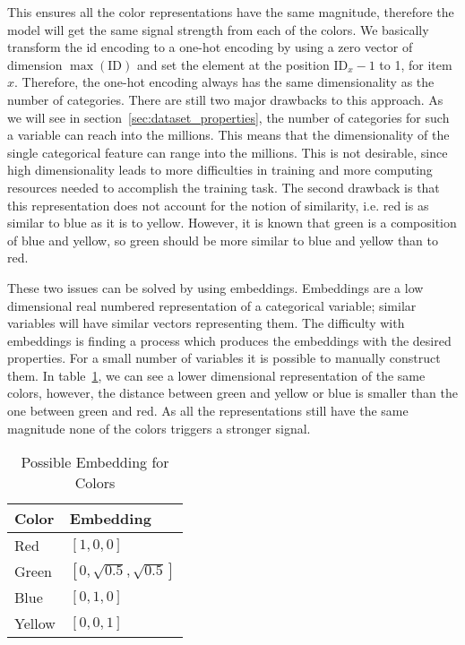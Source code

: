 This ensures all the color representations have the same magnitude, therefore the model will get the same signal strength from each of the colors.
We basically transform the id encoding to a one-hot encoding by using a zero vector of dimension $\max(\text{ID})$ and set the element at the position $\text{ID}_x-1$ to 1, for item $x$.
Therefore, the one-hot encoding always has the same dimensionality as the number of categories.
There are still two major drawbacks to this approach.
As we will see in section~\ref{sec:dataset_properties}, the number of categories for such a variable can reach into the millions.
This means that the dimensionality of the single categorical feature can range into the millions.
This is not desirable, since high dimensionality leads to more difficulties in training and more computing resources needed to accomplish the training task.
The second drawback is that this representation does not account for the notion of similarity, i.e. red is as similar to blue as it is to yellow.
However, it is known that green is a composition of blue and yellow, so green should be more similar to blue and yellow than to red.
\par
These two issues can be solved by using embeddings.
Embeddings are a low dimensional real numbered representation of a categorical variable; similar variables will have similar vectors representing them.
The difficulty with embeddings is finding a process which produces the embeddings with the desired properties.
For a small number of variables it is possible to manually construct them.
In table~\ref{tab:embedding}, we can see a lower dimensional representation of the same colors, however, the distance between green and yellow or blue is smaller than the one between green and red.
As all the representations still have the same magnitude none of the colors triggers a stronger signal.
\begin{table}[t]
    \centering
    \begin{tabular}{ll}\toprule
    
    \textbf{Color} & \textbf{Embedding} \\ \midrule
    Red & $[1,0,0]$ \\
    Green & $[0,\sqrt{0.5},\sqrt{0.5}]$ \\
    Blue & $[0,1,0]$ \\
    Yellow & $[0,0,1]$ \\ \bottomrule
    \end{tabular}
    \caption{Possible Embedding for Colors}
    \label{tab:embedding}
\end{table}

